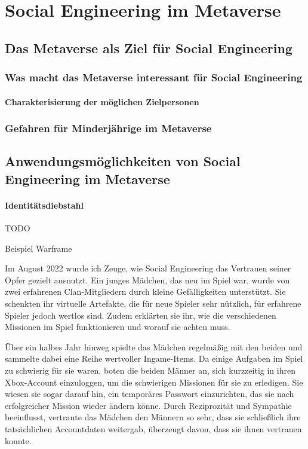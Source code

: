 \chapter{Social Engineering im Metaverse}\label{ch:SocialEngineeringimMV}

\section{Das Metaverse als Ziel für Social Engineering}

\subsection{Was macht das Metaverse interessant für Social Engineering}

\subsubsection{Charakterisierung der möglichen Zielpersonen}

\subsection{Gefahren für Minderjährige im Metaverse}

\section{Anwendungsmöglichkeiten von Social Engineering im Metaverse}

\subsubsection{Identitätsdiebstahl}
TODO

Beispiel Warframe

Im August 2022 wurde ich Zeuge, wie Social Engineering das Vertrauen seiner Opfer gezielt ausnutzt. Ein junges Mädchen, das neu im Spiel war, wurde von zwei erfahrenen Clan-Mitgliedern durch kleine Gefälligkeiten unterstützt. Sie schenkten ihr virtuelle Artefakte, die für neue Spieler sehr nützlich, für erfahrene Spieler jedoch wertlos sind. Zudem erklärten sie ihr, wie die verschiedenen Missionen im Spiel funktionieren und worauf sie achten muss.

Über ein halbes Jahr hinweg spielte das Mädchen regelmäßig mit den beiden und sammelte dabei eine Reihe wertvoller Ingame-Items. Da einige Aufgaben im Spiel zu schwierig für sie waren, boten die beiden Männer an, sich kurzzeitig in ihren Xbox-Account einzuloggen, um die schwierigen Missionen für sie zu erledigen. Sie wiesen sie sogar darauf hin, ein temporäres Passwort einzurichten, das sie nach erfolgreicher Mission wieder ändern könne. Durch Reziprozität und Sympathie beeinflusst, vertraute das Mädchen den Männern so sehr, dass sie schließlich ihre tatsächlichen Accountdaten weitergab, überzeugt davon, dass sie ihnen vertrauen konnte.


